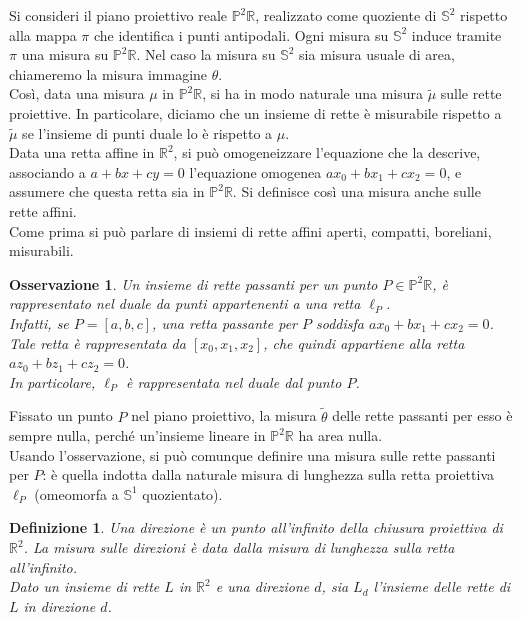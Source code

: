\documentclass[a4paper, twoside,openright]{article}
\newcommand{\R}{\mathbb{R}}
\renewcommand{\P}{\mathbb{P}}
\renewcommand{\S}{\mathbb{S}}
\newcommand{\<}{\langle}
\renewcommand{\>}{\rangle}
\newtheorem{defin}[teo]{Definizione}
\newtheorem{oss}[teo]{Osservazione}
\begin{document}
Si consideri il piano proiettivo reale $\P^2 \R$, realizzato come quoziente di $\S^2$ rispetto alla mappa $\pi$ che identifica i punti antipodali. Ogni misura su $\S^2$ induce tramite $\pi$ una misura su $\P^2\R$. Nel caso la misura su $\S^2$ sia misura usuale di area, chiameremo la misura immagine $\theta$.\\
Così, data una misura $\mu$ in $\P^2 \R$, si ha in modo naturale una misura $\tilde \mu$ sulle rette proiettive. In particolare, diciamo che un insieme di rette è misurabile rispetto a $\tilde \mu$ se l'insieme di punti duale lo è rispetto a $\mu$.\\

Data una retta affine in $\R^2$, si può omogeneizzare l'equazione che la descrive, associando a $a+bx+cy=0$ l'equazione omogenea $ax_0+bx_1+cx_2=0$, e assumere che questa retta sia in $\P^2 \R$. Si definisce così una misura anche sulle rette affini.\\
Come prima si può parlare di insiemi di rette affini aperti, compatti, boreliani, misurabili.

\begin{oss}
	\label{osservazione}
	Un insieme di rette passanti per un punto $P \in \P^2 \R$, è rappresentato nel duale da punti appartenenti a una retta $\ell_P$.\\
	Infatti, se $P=[a,b,c]$, una retta passante per $P$ soddisfa $ax_0+bx_1+cx_2=0$. Tale retta è rappresentata da $[x_0,x_1,x_2]$, che quindi appartiene alla retta $az_0+bz_1+cz_2=0$.\\
	In particolare, $\ell_P$ è rappresentata nel duale dal punto $P$.
\end{oss}

Fissato un punto $P$ nel piano proiettivo, la misura $\tilde \theta$ delle rette passanti per esso è sempre nulla, perché un'insieme lineare in $\P^2 \R$ ha area nulla.\\
Usando l'osservazione, si può comunque definire una misura sulle rette passanti per $P$: è quella indotta dalla naturale misura di lunghezza sulla retta proiettiva $\ell_P$ (omeomorfa a $\S^1$ quozientato).

\begin{defin}
Una direzione è un punto all'infinito della chiusura proiettiva di $\R^2$. La misura sulle direzioni è data dalla misura di lunghezza sulla retta all'infinito.\\
Dato un insieme di rette $L$ in $\R^2$ e una direzione $d$, sia $L_{d}$ l'insieme delle rette di $L$ in direzione $d$.
\end{defin}
\end{document}
